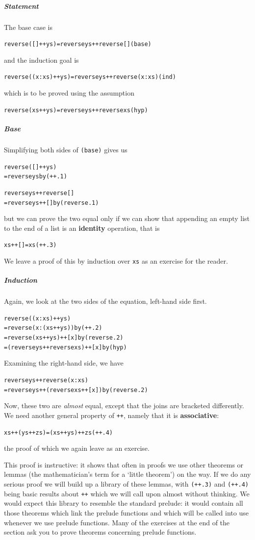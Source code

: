 \begin{example}
\subparagraph*{Statement} The base case is
\begin{alltt}
reverse ([] ++ ys) = reverse ys ++ reverse []\hfill(base)
\end{alltt} 
and the induction goal is 
\begin{alltt}
reverse ((x:xs) ++ ys) = reverse ys ++ reverse (x:xs)\hfill(ind)
\end{alltt}
which is to be proved using the assumption
\begin{alltt}
reverse (xs ++ ys) = reverse ys ++ reverse xs\hfill(hyp)
\end{alltt}

\subparagraph*{Base} Simplifying both sides of \texttt{(base)} gives us 
\begin{alltt}
reverse ([] ++ ys) 
  = reverse ys \hfill \textrm{by }(++.1)

reverse ys ++ reverse []
  = reverse ys ++ [] \hfill \textrm{by }(reverse.1)
\end{alltt}
but we can prove the two equal only if we can show that appending an empty
list to the end of a list is an \textbf{identity} operation, that
is
\begin{alltt}
xs ++ [] = xs\hfill(++.3)
\end{alltt}
We leave a proof of this by induction over \texttt{xs} as an exercise for the reader.

\subparagraph*{Induction} Again, we look at the two sides of the equation, left-hand
side first.
\begin{alltt}
reverse ((x:xs) ++ ys) 
  = reverse (x:(xs ++ ys)) \hfill \textrm{by }(++.2)
  = reverse (xs ++ ys) ++ [x]  \hfill \textrm{by }(reverse.2)
  = (reverse ys ++ reverse xs) ++ [x]  \hfill \textrm{by }(hyp)
\end{alltt}
Examining the right-hand side, we have
\begin{alltt}
reverse ys ++ reverse (x:xs)
  = reverse ys ++ (reverse xs ++ [x]) \hfill \textrm{by }(reverse.2)
\end{alltt}
Now, these two are {\em almost\/} equal, except that the joins are
bracketed differently. We need another general property of \texttt{++},
namely that it is \textbf{associative}:
\begin{alltt}
xs ++ (ys ++ zs) = (xs ++ ys) ++ zs\hfill(++.4)
\end{alltt}
the proof of which we again leave as an exercise.\blackbox
\end{example}

\noindent This proof is instructive: it shows that often in proofs we use other
theorems or lemmas (the mathematician's term for a `little theorem') on
the way. If we do any serious proof we will build up a library of these
lemmas, with \texttt{(++.3)} and \texttt{(++.4)} being basic results about
\texttt{++} which we will call upon almost without thinking. We would expect
this library to resemble the standard prelude: it would contain all those
theorems which link the prelude functions and which will be called into use
whenever we use prelude functions. Many of the exercises at the end of the
section ask you to prove theorems concerning prelude functions.

